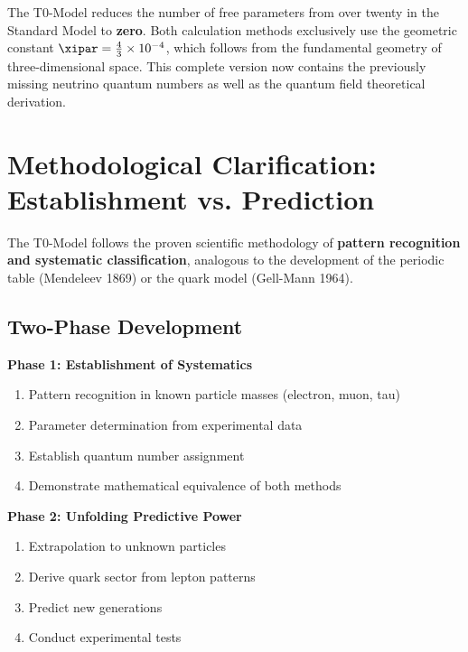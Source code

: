 	\begin{important}
		The T0-Model reduces the number of free parameters from over twenty in the Standard Model to \textbf{zero}. Both calculation methods exclusively use the geometric constant $\xipar = \frac{4}{3} \times 10^{-4}$, which follows from the fundamental geometry of three-dimensional space. This complete version now contains the previously missing neutrino quantum numbers as well as the quantum field theoretical derivation.
	\end{important}
	
	\section{Methodological Clarification: Establishment vs. Prediction}
	\label{sec:methodological_clarification}
	
	\begin{important}
		The T0-Model follows the proven scientific methodology of \textbf{pattern recognition and systematic classification}, analogous to the development of the periodic table (Mendeleev 1869) or the quark model (Gell-Mann 1964).
	\end{important}
	
	\subsection{Two-Phase Development}
	\label{subsec:two_phases}
	
	\textbf{Phase 1: Establishment of Systematics}
	\begin{enumerate}
		\item Pattern recognition in known particle masses (electron, muon, tau)
		\item Parameter determination from experimental data
		\item Establish quantum number assignment
		\item Demonstrate mathematical equivalence of both methods
	\end{enumerate}
	
	\textbf{Phase 2: Unfolding Predictive Power}
	\begin{enumerate}
		\item Extrapolation to unknown particles
		\item Derive quark sector from lepton patterns
		\item Predict new generations
		\item Conduct experimental tests
	\end{enumerate}
	
